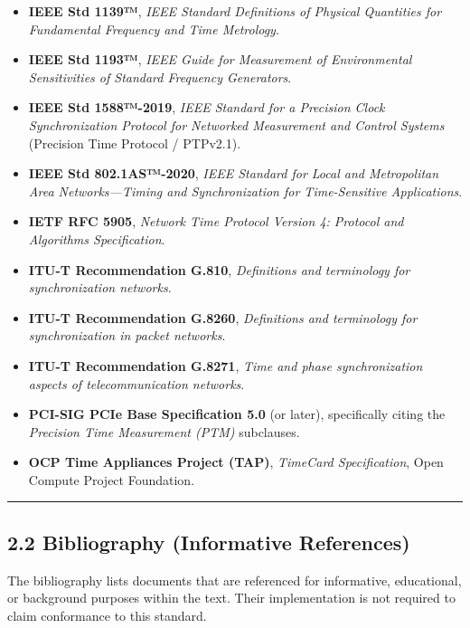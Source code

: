 \begin{itemize}
\tightlist
\item
  \textbf{IEEE Std 1139™}, \emph{IEEE Standard Definitions of Physical
  Quantities for Fundamental Frequency and Time Metrology}.
\item
  \textbf{IEEE Std 1193™}, \emph{IEEE Guide for Measurement of
  Environmental Sensitivities of Standard Frequency Generators}.
\item
  \textbf{IEEE Std 1588™-2019}, \emph{IEEE Standard for a Precision
  Clock Synchronization Protocol for Networked Measurement and Control
  Systems} (Precision Time Protocol / PTPv2.1).
\item
  \textbf{IEEE Std 802.1AS™-2020}, \emph{IEEE Standard for Local and
  Metropolitan Area Networks---Timing and Synchronization for
  Time-Sensitive Applications}.
\item
  \textbf{IETF RFC 5905}, \emph{Network Time Protocol Version 4:
  Protocol and Algorithms Specification}.
\item
  \textbf{ITU-T Recommendation G.810}, \emph{Definitions and terminology
  for synchronization networks}.
\item
  \textbf{ITU-T Recommendation G.8260}, \emph{Definitions and
  terminology for synchronization in packet networks}.
\item
  \textbf{ITU-T Recommendation G.8271}, \emph{Time and phase
  synchronization aspects of telecommunication networks}.
\item
  \textbf{PCI-SIG PCIe Base Specification 5.0} (or later), specifically
  citing the \emph{Precision Time Measurement (PTM)} subclauses.
\item
  \textbf{OCP Time Appliances Project (TAP)}, \emph{TimeCard
  Specification}, Open Compute Project Foundation.
\end{itemize}

\begin{center}\rule{0.5\linewidth}{0.5pt}\end{center}

\subsection{2.2 Bibliography (Informative
References)}\label{bibliography-informative-references}

The bibliography lists documents that are referenced for informative,
educational, or background purposes within the text. Their
implementation is not required to claim conformance to this standard.


